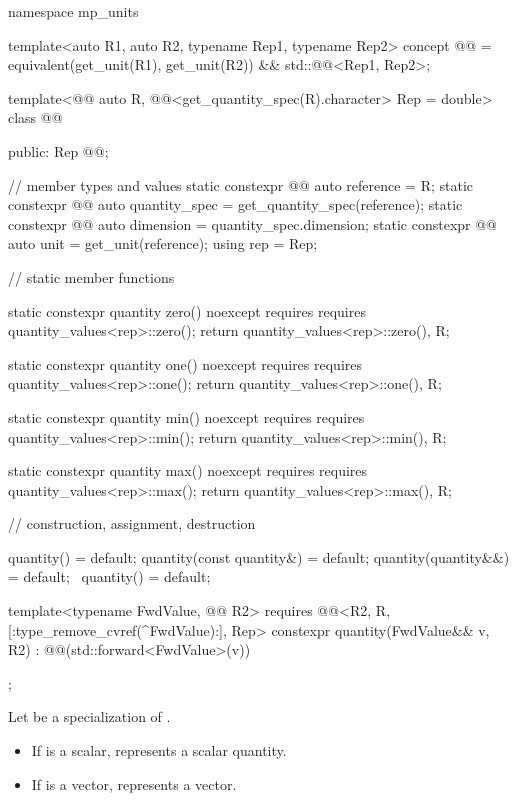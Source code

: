 \begin{codeblock}
namespace mp_units {

template<auto R1, auto R2, typename Rep1, typename Rep2>
concept @@ =
  equivalent(get_unit(R1), get_unit(R2)) && std::@@<Rep1, Rep2>;

template<@@ auto R, @@<get_quantity_spec(R).character> Rep = double>
class @@ {
public:
  Rep @@;

  // member types and values
  static constexpr @@ auto reference = R;
  static constexpr @@ auto quantity_spec = get_quantity_spec(reference);
  static constexpr @@ auto dimension = quantity_spec.dimension;
  static constexpr @@ auto unit = get_unit(reference);
  using rep = Rep;

  // static member functions

  static constexpr quantity zero() noexcept
    requires requires { quantity_values<rep>::zero(); }
  {
    return {quantity_values<rep>::zero(), R};
  }

  static constexpr quantity one() noexcept
    requires requires { quantity_values<rep>::one(); }
  {
    return {quantity_values<rep>::one(), R};
  }

  static constexpr quantity min() noexcept
    requires requires { quantity_values<rep>::min(); }
  {
    return {quantity_values<rep>::min(), R};
  }

  static constexpr quantity max() noexcept
    requires requires { quantity_values<rep>::max(); }
  {
    return {quantity_values<rep>::max(), R};
  }

  // construction, assignment, destruction

  quantity() = default;
  quantity(const quantity&) = default;
  quantity(quantity&&) = default;
  ~quantity() = default;

  template<typename FwdValue, @@ R2>
    requires @@<R2{}, R, [:type_remove_cvref(^FwdValue):], Rep>
  constexpr quantity(FwdValue&& v, R2) : @@(std::forward<FwdValue>(v))
  {
  }
};

}
\end{codeblock}

\pnum
Let  be a specialization of .
\begin{itemize}
\item
If  is a scalar,
 represents a scalar quantity.
\item
If  is a vector,
 represents a vector.
\end{itemize}

